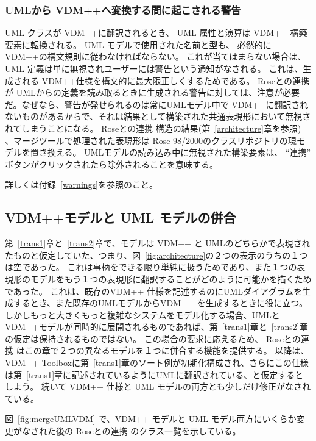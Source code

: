 \documentclass[\pformat,12pt]{jarticle}
\newcommand{\vdmpp}{VDM++}
\newcommand{\link}{Roseとの連携}
\newcommand{\rose}{Rose 98/2000}
\begin{document}
\subsubsection*{UMLから \vdmpp{}へ変換する間に起こされる警告}


UML クラスが \vdmpp{}に翻訳されるとき、 UML 属性と演算は \vdmpp{} 構築要素に転換される。  
 UML モデルで使用された名前と型も、 必然的に\vdmpp{}の構文規則に従わなければならない。
これが当てはまらない場合は、 UML 定義は単に無視されユーザーには警告という通知がなされる。
これは、生成される \vdmpp{}仕様を構文的に最大限正しくするためである。
\link{} が UMLからの定義を読み取るときに生成される警告に対しては、注意が必要だ。なぜなら、警告が発せられるのは常にUMLモデル中で \vdmpp{}に翻訳されないものがあるからで、それは結果として構築された共通表現形において無視されてしまうことになる。 \link{} 構造の結果(第~\ref{architecture}章を参照) 、マージツールで処理された表現形は \rose{}のクラスリポジトリの現モデルを置き換える。 
UMLモデルの読み込み中に無視された構築要素は、 ``連携'' ボタンがクリックされたら除外されることを意味する。

詳しくは付録~\ref{warnings}を参照のこと。

\subsection{VDM++モデルと UML モデルの併合} \label{merging}


第~\ref{trans1}章と~\ref{trans2}章で、モデルは \vdmpp{} と UMLのどちらかで表現されたものと仮定していた、つまり、図~\ref{fig:architecture}の２つの表示のうちの１つは空であった。
これは事柄をできる限り単純に扱うためであり、また１つの表現形のモデルをもう１つの表現形に翻訳することがどのように可能かを描くためであった。
これは、既存の\vdmpp{} 仕様を記述するのにUMLダイアグラムを生成するとき、また既存のUMLモデルから\vdmpp{} を生成するときに役に立つ。
しかしもっと大きくもっと複雑なシステムをモデル化する場合、UMLと \vdmpp{}モデルが同時的に展開されるものであれば、第~\ref{trans1}章と~\ref{trans2}章の仮定は保持されるものではない。
この場合の要求に応えるため、 \link{} はこの章で２つの異なるモデルを１つに併合する機能を提供する。
以降は、\vdmpp{} Toolboxに第~\ref{trans1}章のソート例が初期化構成され、さらにこの仕様は第~\ref{trans1}章に記述されているようにUMLに翻訳されている、と仮定するとしよう。
続いて \vdmpp{} 仕様と UML モデルの両方とも少しだけ修正がなされている。

図~\ref{fig:mergeUMLVDM} で、\vdmpp{} モデルと UML モデル両方にいくらか変更がなされた後の \link{} のクラス一覧を示している。
\end{document}

